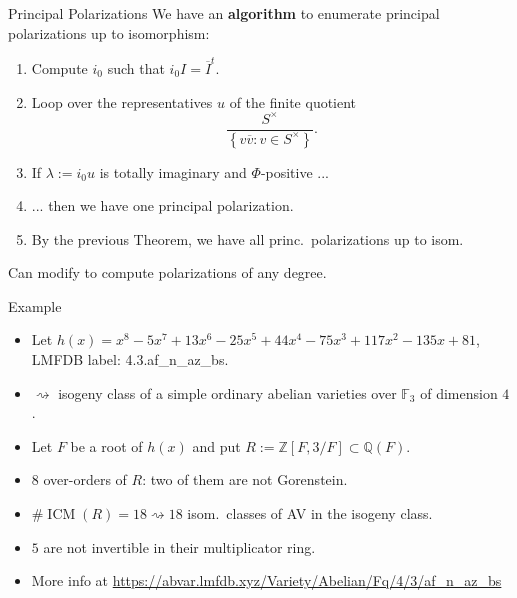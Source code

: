 \documentclass[usenames,dvipsnames,handout]{beamer}
\def\Q{\mathbb{Q}}
\def\Z{\mathbb{Z}}
\def\F{\mathbb{F}}
\DeclareMathOperator{\ICM}{ICM}
\newcommand{\set}[1]{\left\lbrace#1\right\rbrace }
\begin{document}
\begin{frame}{Principal Polarizations}
    We have an {\bf algorithm} to enumerate principal polarizations up to isomorphism:
\pause
    \begin{enumerate}
    \item Compute $i_0$ such that $i_0 I = \overline{I}^t$.
\pause
    \item Loop over the representatives $u$ of the finite quotient
    \[ \frac{S^\times}{\set{v\overline{v}: v\in S^\times}}. \]
\pause    
    \item If $\lambda:=i_0 u$ is totally imaginary and $\Phi$-positive ...
\pause    
    \item ... then we have one principal polarization.
\pause    
    \item By the previous Theorem, we have all princ.~polarizations up to isom.
    \end{enumerate}
\pause 
    Can modify to compute polarizations of any degree.
\end{frame}

\begin{frame}{Example}
	\begin{itemize}
    \item Let $h(x)=x^8 - 5x^7 + 13x^6 - 25x^5 + 44x^4 - 75x^3 + 117x^2 - 135x + 81$, LMFDB label: 4.3.af\_n\_az\_bs.
\pause
    \item $\rightsquigarrow$ isogeny class of a simple ordinary abelian varieties over $\F_{3}$ of dimension $4$.
\pause
    \item Let $F$ be a root of $h(x)$ and put $R:=\Z[F,3/F]\subset \Q(F)$.
\pause
    \item $8$ over-orders of $R$: two of them are not Gorenstein.
\pause
    \item $\#\ICM(R) = 18 \rightsquigarrow 18$ isom.~classes of AV in the isogeny class.
\pause
    \item $5$ are not invertible in their multiplicator ring.
\pause
    \item More info at {\footnotesize \url{https://abvar.lmfdb.xyz/Variety/Abelian/Fq/4/3/af_n_az_bs}}
	\end{itemize}
\end{frame}
\end{document}
